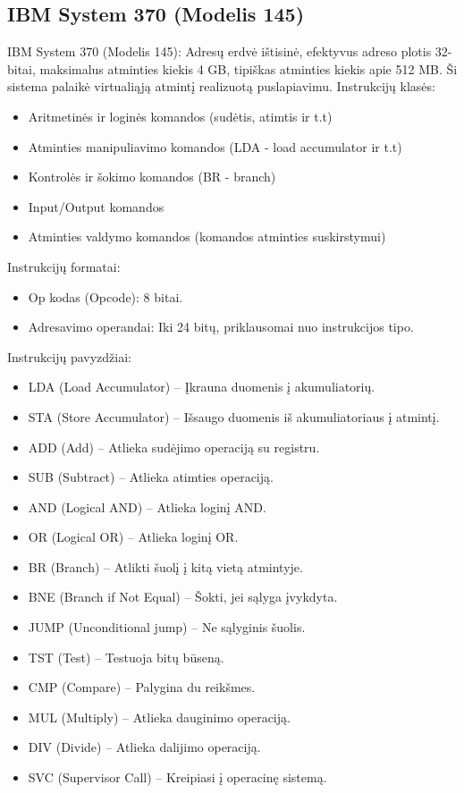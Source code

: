\documentclass{article}
\begin{document}
\subsection*{IBM System 370 (Modelis 145)}
IBM System 370 (Modelis 145): Adresų erdvė ištisinė, efektyvus adreso plotis 32-bitai, maksimalus atminties kiekis 4 GB, tipiškas atminties kiekis apie 512 MB. Ši sistema palaikė virtualiąją atmintį realizuotą puslapiavimu. Instrukcijų klasės:
\begin{itemize}
    \item Aritmetinės ir loginės komandos (sudėtis, atimtis ir t.t)
    \item Atminties manipuliavimo komandos (LDA - load accumulator ir t.t)
    \item Kontrolės ir šokimo komandos (BR - branch)
    \item Input/Output komandos
    \item Atminties valdymo komandos (komandos atminties suskirstymui)
\end{itemize}
Instrukcijų formatai:
\begin{itemize}
    \item Op kodas (Opcode): 8 bitai.
    \item Adresavimo operandai: Iki 24 bitų, priklausomai nuo instrukcijos tipo.
\end{itemize}
Instrukcijų pavyzdžiai:
\begin{itemize}
    \item LDA (Load Accumulator) – Įkrauna duomenis į akumuliatorių.
    \item STA (Store Accumulator) – Išsaugo duomenis iš akumuliatoriaus į atmintį.
    \item ADD (Add) – Atlieka sudėjimo operaciją su registru.
    \item SUB (Subtract) – Atlieka atimties operaciją.
    \item AND (Logical AND) – Atlieka loginį AND.
    \item OR (Logical OR) – Atlieka loginį OR.
    \item BR (Branch) – Atlikti šuolį į kitą vietą atmintyje.
    \item BNE (Branch if Not Equal) – Šokti, jei sąlyga įvykdyta.
    \item JUMP (Unconditional jump) – Ne sąlyginis šuolis.
    \item TST (Test) – Testuoja bitų būseną.
    \item CMP (Compare) – Palygina du reikšmes.
    \item MUL (Multiply) – Atlieka dauginimo operaciją.
    \item DIV (Divide) – Atlieka dalijimo operaciją.
    \item SVC (Supervisor Call) – Kreipiasi į operacinę sistemą.

\end{itemize}
\end{document}
